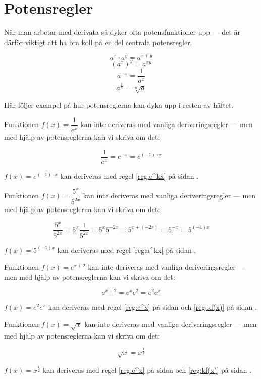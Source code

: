 \documentclass[a4paper, 12pt]{article}
\begin{document}
\newpage

\section{Potensregler}
\label{app:pot}
När man arbetar med derivata så dyker ofta potensfunktioner upp --- det är därför viktigt att ha bra koll på en del centrala potensregler.


\begin{regel}
    \[a^x \cdot a^y = a^{x+y} \]
    \[\left(a^x\right)^y = a^{xy}\]
    \[a^{-x} = \dfrac 1{a^x}\]
    \[a^{\frac 1n} = \sqrt[n]a\]
\end{regel}

Här följer exempel på hur potensreglerna kan dyka upp i resten av häftet.


\begin{exempel}
    Funktionen $f(x) = \dfrac1{e^x}$ kan inte deriveras med vanliga deriveringsregler --- men med hjälp av potensreglerna kan vi skriva om det:

    \[\dfrac1{e^x} = e^{-x} = e^{(-1)\cdot x}\]

    $f(x) = e^{(-1)\cdot x}$ kan deriveras med regel \ref*{reg:e^kx} på sidan \pageref*{reg:e^kx}.
\end{exempel}

\begin{exempel}
    Funktionen $f(x) = \dfrac {5^x}{5^{2x}}$ kan inte deriveras med vanliga deriveringsregler --- men med hjälp av potensreglerna kan vi skriva om det:

    \[\dfrac {5^x}{5^{2x}} = 5^x \dfrac 1{5^{2x}} = 5^x 5^{-2x} = 5^{x+(-2x)} = 5^{-x} = 5^{(-1)x}\]

    $f(x) = 5^{(-1)x}$ kan deriveras med regel \ref*{reg:a^kx} på sidan \pageref*{reg:a^kx}.

\end{exempel}

\begin{exempel}
    Funktionen $f(x) = e^{x+2}$ kan inte deriveras med vanliga deriveringsregler --- men med hjälp av potensreglerna kan vi skriva om det:

    \[e^{x+2} = e^xe^2 = e^2e^x\]

    $f(x) = e^2e^x$ kan deriveras med regel \ref*{reg:e^x} på sidan \pageref*{reg:e^x} och \ref*{reg:kf(x)} på sidan \pageref*{reg:kf(x)}.
\end{exempel}

\begin{exempel}
    Funktionen $f(x) = \sqrt{x}$ kan inte deriveras med vanliga deriveringsregler --- men med hjälp av potensreglerna kan vi skriva om det:

    \[\sqrt{x} = x^{\frac 12}\]

    $f(x) = x^{\frac 12}$ kan deriveras med regel \ref*{reg:e^x} på sidan \pageref*{reg:e^x} och \ref*{reg:kf(x)} på sidan \pageref*{reg:kf(x)}.
\end{exempel}
\end{document}
